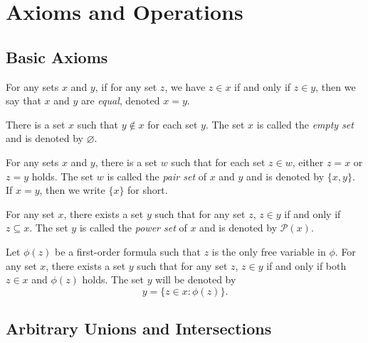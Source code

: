 \chapter{Axioms and Operations}
\section{Basic Axioms}
\begin{axiom}[Extensionality]
  For any sets $x$ and $y$, if for any set $z$, we have $z \in x$ if and only
  if $z \in y$, then we say that $x$ and $y$ are \emph{equal}, denoted $x = y$.
\end{axiom}

\begin{axiom}
  There is a set $x$ such that $y \notin x$ for each set $y$.
  The set $x$ is called the \emph{empty set} and is denoted by $\varnothing$.
\end{axiom}

\begin{axiom}[Pairing]
  For any sets $x$ and $y$, there is a set $w$ such that for each set
  $z \in w$, either $z = x$ or $z = y$ holds.
  The set $w$ is called the \emph{pair set} of $x$ and $y$ and is denoted by
  $\{x, y\}$.
  If $x = y$, then we write $\{x\}$ for short.
\end{axiom}

\begin{axiom}
  For any set $x$, there exists a set $y$ such that for any set $z$, $z \in y$
  if and only if $z \subseteq x$.
  The set $y$ is called the \emph{power set} of $x$ and is denoted by
  $\mathcal{P}(x)$.
\end{axiom}

\begin{axiom}[Subset]
  Let $\phi(z)$ be a first-order formula such that $z$ is the only free
  variable in $\phi$.
  For any set $x$, there exists a set $y$ such that for any set $z$, $z \in y$
  if and only if both $z \in x$ and $\phi(z)$ holds.
  The set $y$ will be denoted by
  \begin{equation*}
    y = \{z \in x: \phi(z)\}.
  \end{equation*}
\end{axiom}

\section{Arbitrary Unions and Intersections}